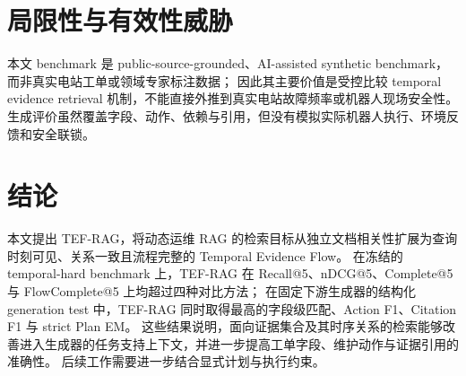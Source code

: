 \begin{table}[t]
\caption{Generation test 的主要结构化生成指标}
\label{tab:generation_results}
\centering
\small
\setlength{\tabcolsep}{3pt}
\end{table}

\section{局限性与有效性威胁}
\label{sec:limitations}

本文 benchmark 是 public-source-grounded、AI-assisted synthetic benchmark，而非真实电站工单或领域专家标注数据；
因此其主要价值是受控比较 temporal evidence retrieval 机制，不能直接外推到真实电站故障频率或机器人现场安全性。
生成评价虽然覆盖字段、动作、依赖与引用，但没有模拟实际机器人执行、环境反馈和安全联锁。

\section{结论}
\label{sec:conclusion}

本文提出 TEF-RAG，将动态运维 RAG 的检索目标从独立文档相关性扩展为查询时刻可见、关系一致且流程完整的 Temporal Evidence Flow。
在冻结的 temporal-hard benchmark 上，TEF-RAG 在 Recall@5、nDCG@5、Complete@5 与 FlowComplete@5 上均超过四种对比方法；
在固定下游生成器的结构化 generation test 中，TEF-RAG 同时取得最高的字段级匹配、Action F1、Citation F1 与 strict Plan EM。
这些结果说明，面向证据集合及其时序关系的检索能够改善进入生成器的任务支持上下文，并进一步提高工单字段、维护动作与证据引用的准确性。
后续工作需要进一步结合显式计划与执行约束。
